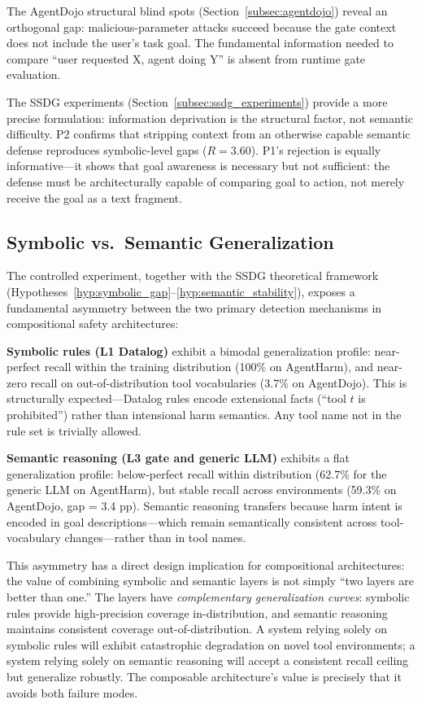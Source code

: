 \documentclass[conference]{IEEEtran}
\theoremstyle{definition}
\begin{document}
The AgentDojo structural blind spots (Section~\ref{subsec:agentdojo})
reveal an orthogonal gap: malicious-parameter attacks succeed because the
gate context does not include the user's task goal. The fundamental
information needed to compare ``user requested X, agent doing Y'' is absent
from runtime gate evaluation.

The SSDG experiments (Section~\ref{subsec:ssdg_experiments}) provide
a more precise formulation: information deprivation is the structural
factor, not semantic difficulty. P2 confirms that stripping context
from an otherwise capable semantic defense reproduces symbolic-level
gaps ($R = 3.60$). P1's rejection is equally informative---it shows
that goal awareness is necessary but not sufficient: the defense must
be architecturally capable of comparing goal to action, not merely
receive the goal as a text fragment.

\subsection{Symbolic vs.\ Semantic Generalization}
\label{subsec:disc_generalization}

The controlled experiment, together with the SSDG theoretical framework
(Hypotheses~\ref{hyp:symbolic_gap}--\ref{hyp:semantic_stability}),
exposes a fundamental asymmetry between the two
primary detection mechanisms in compositional safety architectures:

\textbf{Symbolic rules (L1 Datalog)} exhibit a bimodal generalization
profile: near-perfect recall within the training distribution (100\% on
AgentHarm), and near-zero recall on out-of-distribution tool vocabularies
(3.7\% on AgentDojo). This is structurally expected---Datalog rules
encode extensional facts (``tool $t$ is prohibited'') rather than
intensional harm semantics. Any tool name not in the rule set is
trivially allowed.

\textbf{Semantic reasoning (L3 gate and generic LLM)} exhibits a flat
generalization profile: below-perfect recall within distribution
(62.7\% for the generic LLM on AgentHarm), but stable recall across
environments (59.3\% on AgentDojo, gap = 3.4 pp). Semantic reasoning
transfers because harm intent is encoded in goal descriptions---which
remain semantically consistent across tool-vocabulary changes---rather
than in tool names.

This asymmetry has a direct design implication for compositional
architectures: the value of combining symbolic and semantic layers is
not simply ``two layers are better than one.'' The layers have
\emph{complementary generalization curves}: symbolic rules provide
high-precision coverage in-distribution, and semantic reasoning maintains
consistent coverage out-of-distribution. A system relying solely on
symbolic rules will exhibit catastrophic degradation on novel tool
environments; a system relying solely on semantic reasoning will accept
a consistent recall ceiling but generalize robustly. The composable
architecture's value is precisely that it avoids both failure modes.
\end{document}
